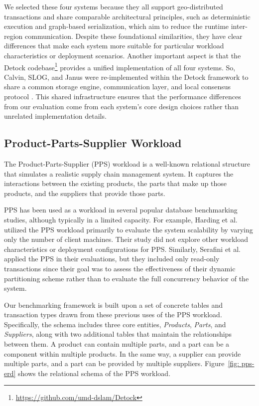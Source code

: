 We selected these four systems because they all support geo-distributed transactions and share comparable architectural principles, such as deterministic execution and graph-based serialization, which aim to reduce the runtime inter-region communication. Despite these foundational similarities, they have clear differences that make each system more suitable for particular workload characteristics or deployment scenarios. Another important aspect is that the Detock codebase\footnote{\url{https://github.com/umd-dslam/Detock}} provides a unified implementation of all four systems. So, Calvin, SLOG, and Janus were re-implemented within the Detock framework to share a common storage engine, communication layer, and local consensus protocol \cite{nguyen2023detock}. This shared infrastructure ensures that the performance differences from our evaluation come from each system's core design choices rather than unrelated implementation details.

\subsection{Product-Parts-Supplier Workload}
\label{subsec: product-parts-supplier-workload}
The Product-Parts-Supplier (PPS) workload is a well-known relational structure that simulates a realistic supply chain management system. It captures the interactions between the existing products, the parts that make up those products, and the suppliers that provide those parts.

PPS has been used as a workload in several popular database benchmarking studies, although typically in a limited capacity. For example, Harding et al.~\cite{harding2017evaluation} utilized the PPS workload primarily to evaluate the system scalability by varying only the number of client machines. Their study did not explore other workload characteristics or deployment configurations for PPS. Similarly, Serafini et al.~\cite{serafini2016clay} applied the PPS in their evaluations, but they included only read-only transactions since their goal was to assess the effectiveness of their dynamic partitioning scheme rather than to evaluate the full concurrency behavior of the system.

Our benchmarking framework is built upon a set of concrete tables and transaction types drawn from these previous uses of the PPS workload. Specifically, the schema includes three core entities, \textit{Products}, \textit{Parts}, and \textit{Suppliers}, along with two additional tables that maintain the relationships between them. A product can contain multiple parts, and a part can be a component within multiple products. In the same way, a supplier can provide multiple parts, and a part can be provided by multiple suppliers. Figure~\ref{fig: pps-erd} shows the relational schema of the PPS workload.

